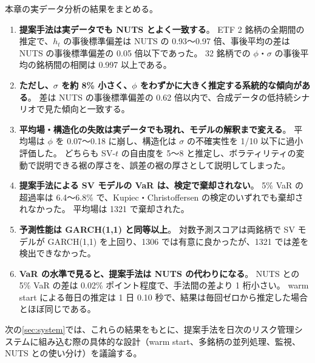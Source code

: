 本章の実データ分析の結果をまとめる。

\begin{enumerate}
  \item \textbf{提案手法は実データでも NUTS とよく一致する}。
    ETF 2 銘柄の全期間の推定で、$h_t$ の事後標準偏差は NUTS の 0.93〜0.97 倍、事後平均の差は NUTS の事後標準偏差の 0.05 倍以下であった。
    32 銘柄での $\phi$・$\sigma$ の事後平均の銘柄間の相関は 0.997 以上である。
  \item \textbf{ただし、$\sigma$ を約 8\% 小さく、$\phi$ をわずかに大きく推定する系統的な傾向がある}。
    差は NUTS の事後標準偏差の 0.62 倍以内で、合成データの低持続シナリオで見た傾向と一致する。
  \item \textbf{平均場・構造化の失敗は実データでも現れ、モデルの解釈まで変える}。
    平均場は $\phi$ を 0.07〜0.18 に崩し、構造化は $\sigma$ の不確実性を 1/10 以下に過小評価した。
    どちらも SV-$t$ の自由度を 5〜8 と推定し、ボラティリティの変動で説明できる裾の厚さを、誤差の裾の厚さとして説明してしまった。
  \item \textbf{提案手法による SV モデルの VaR は、検定で棄却されない}。
    5\% VaR の超過率は 6.4〜6.8\% で、Kupiec・Christoffersen の検定のいずれでも棄却されなかった。
    平均場は 1321 で棄却された。
  \item \textbf{予測性能は GARCH(1,1) と同等以上}。
    対数予測スコアは両銘柄で SV モデルが GARCH(1,1) を上回り、1306 では有意に良かったが、1321 では差を検出できなかった。
  \item \textbf{VaR の水準で見ると、提案手法は NUTS の代わりになる}。
    NUTS との 5\% VaR の差は 0.02\% ポイント程度で、手法間の差より 1 桁小さい。
    warm start による毎日の推定は 1 日 0.10 秒で、結果は毎回ゼロから推定した場合とほぼ同じである。
\end{enumerate}

次の\cref{sec:system}では、これらの結果をもとに、提案手法を日次のリスク管理システムに組み込む際の具体的な設計（warm start、多銘柄の並列処理、監視、NUTS との使い分け）を議論する。
